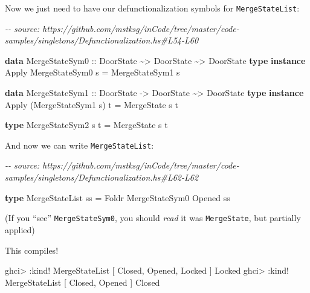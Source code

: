 \documentclass[]{article}
\newenvironment{Shaded}{}{}
\newcommand{\CommentTok}[1]{\textcolor[rgb]{0.38,0.63,0.69}{\textit{#1}}}
\newcommand{\DataTypeTok}[1]{\textcolor[rgb]{0.56,0.13,0.00}{#1}}
\newcommand{\KeywordTok}[1]{\textcolor[rgb]{0.00,0.44,0.13}{\textbf{#1}}}
\newcommand{\NormalTok}[1]{#1}
\newcommand{\OperatorTok}[1]{\textcolor[rgb]{0.40,0.40,0.40}{#1}}
\newcommand{\OtherTok}[1]{\textcolor[rgb]{0.00,0.44,0.13}{#1}}
\begin{document}
Now we just need to have our defunctionalization symbols for
\texttt{MergeStateList}:

\begin{Shaded}
\begin{Highlighting}[]
\CommentTok{{-}{-} source: https://github.com/mstksg/inCode/tree/master/code{-}samples/singletons/Defunctionalization.hs\#L54{-}L60}

\KeywordTok{data} \DataTypeTok{MergeStateSym0}\OtherTok{ ::} \DataTypeTok{DoorState} \OperatorTok{\textasciitilde{}>} \DataTypeTok{DoorState} \OperatorTok{\textasciitilde{}>} \DataTypeTok{DoorState}
\KeywordTok{type} \KeywordTok{instance} \DataTypeTok{Apply} \DataTypeTok{MergeStateSym0}\NormalTok{ s }\OtherTok{=} \DataTypeTok{MergeStateSym1}\NormalTok{ s}

\KeywordTok{data} \DataTypeTok{MergeStateSym1}\OtherTok{ ::} \DataTypeTok{DoorState} \OtherTok{{-}>} \DataTypeTok{DoorState} \OperatorTok{\textasciitilde{}>} \DataTypeTok{DoorState}
\KeywordTok{type} \KeywordTok{instance} \DataTypeTok{Apply}\NormalTok{ (}\DataTypeTok{MergeStateSym1}\NormalTok{ s) t }\OtherTok{=} \DataTypeTok{MergeState}\NormalTok{ s t}

\KeywordTok{type} \DataTypeTok{MergeStateSym2}\NormalTok{ s t }\OtherTok{=} \DataTypeTok{MergeState}\NormalTok{ s t}
\end{Highlighting}
\end{Shaded}

And now we can write \texttt{MergeStateList}:

\begin{Shaded}
\begin{Highlighting}[]
\CommentTok{{-}{-} source: https://github.com/mstksg/inCode/tree/master/code{-}samples/singletons/Defunctionalization.hs\#L62{-}L62}

\KeywordTok{type} \DataTypeTok{MergeStateList}\NormalTok{ ss }\OtherTok{=} \DataTypeTok{Foldr} \DataTypeTok{MergeStateSym0} \DataTypeTok{\textquotesingle{}Opened}\NormalTok{ ss}
\end{Highlighting}
\end{Shaded}

(If you ``see'' \texttt{MergeStateSym0}, you should \emph{read} it was
\texttt{MergeState}, but partially applied)

This compiles!

\begin{Shaded}
\begin{Highlighting}[]
\NormalTok{ghci}\OperatorTok{>} \OperatorTok{:}\NormalTok{kind}\OperatorTok{!} \DataTypeTok{MergeStateList}\NormalTok{ \textquotesingle{}[ }\DataTypeTok{\textquotesingle{}Closed}\NormalTok{, }\DataTypeTok{\textquotesingle{}Opened}\NormalTok{, }\DataTypeTok{\textquotesingle{}Locked}\NormalTok{ ]}
\DataTypeTok{\textquotesingle{}Locked}
\NormalTok{ghci}\OperatorTok{>} \OperatorTok{:}\NormalTok{kind}\OperatorTok{!} \DataTypeTok{MergeStateList}\NormalTok{ \textquotesingle{}[ }\DataTypeTok{\textquotesingle{}Closed}\NormalTok{, }\DataTypeTok{\textquotesingle{}Opened}\NormalTok{ ]}
\DataTypeTok{\textquotesingle{}Closed}
\end{Highlighting}
\end{Shaded}
\end{document}
